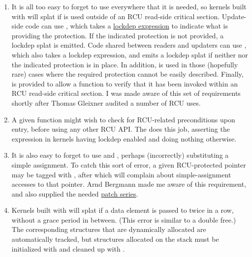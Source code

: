 \begin{enumerate}
\item It is all too easy to forget to use  everywhere
   that it is needed, so kernels built with  will
   splat if  is used outside of an RCU read-side
   critical section.
   Update-side code can use
   , which takes a
   \href{https://lwn.net/Articles/371986/}{lockdep expression} to indicate what is
   providing the protection.
   If the indicated protection is not
   provided, a lockdep splat is emitted.
   Code shared between readers and updaters can use
   , which also takes a lockdep expression,
   and emits a lockdep splat if neither  nor the
   indicated protection is in place.
   In addition,
    is used in those (hopefully rare) cases
   where the required protection cannot be easily described.
   Finally,
    is provided to allow a function to verify
   that it has been invoked within an RCU read-side critical section.
   I
   was made aware of this set of requirements shortly after Thomas
   Gleixner audited a number of RCU uses.
\item A given function might wish to check for RCU-related preconditions
   upon entry, before using any other RCU API\@.
   The
    does this job, asserting the expression in
   kernels having lockdep enabled and doing nothing otherwise.
\item It is also easy to forget to use  and
   , perhaps (incorrectly) substituting a simple
   assignment.
   To catch this sort of error, a given RCU-protected
   pointer may be tagged with , after which  will
   complain about simple-assignment accesses to that pointer.
   Arnd
   Bergmann made me aware of this requirement, and also supplied the
   needed \href{https://lwn.net/Articles/376011/}{patch series}.
\item Kernels built with  will splat if
   a data element is passed to  twice in a row, without a
   grace period in between.
   (This error is similar to a double free.)
   The corresponding  structures that are dynamically
   allocated are automatically tracked, but  structures
   allocated on the stack must be initialized with
    and cleaned up with
   .

\end{enumerate}
